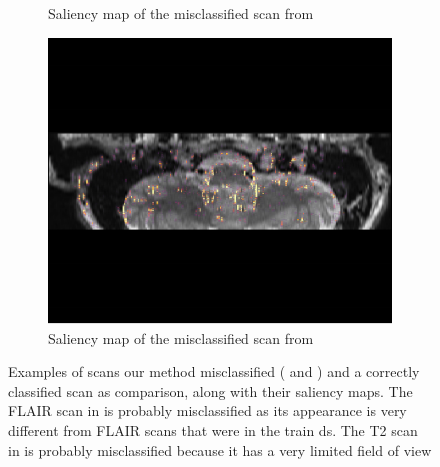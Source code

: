 \begin{figure}
\begin{subfigure}[t]{0.25\textwidth}
        \caption{Saliency map of the misclassified \gls{scan} from \protect{}}\label{fig:RIDER_FLAIR_saliency}
    \end{subfigure}
    \hfill
    \begin{subfigure}[t]{0.25\textwidth}
        \centering
        \includegraphics[width=\textwidth]{Figures/Appendix/Saliency_T2_hippo.pdf}
        \caption{Saliency map of the misclassified \gls{scan} from \protect{}}\label{fig:T2_hippo_saliency}
    \end{subfigure}

\caption{Examples of \glspl{scan} our method misclassified (\protect{} and \protect{}) and a correctly classified \gls{scan} \protect{} as comparison, along with their saliency maps.
The \gls{FLAIR} \gls{scan} in \protect{} is probably misclassified as its appearance is very different from \gls{FLAIR} \glspl{scan} that were in the train \gls{ds}.
The \gls{T2} \gls{scan} in \protect{} is probably misclassified because it has a very limited field of view}
\label{fig:FLAIR_comparison}

\end{figure}

